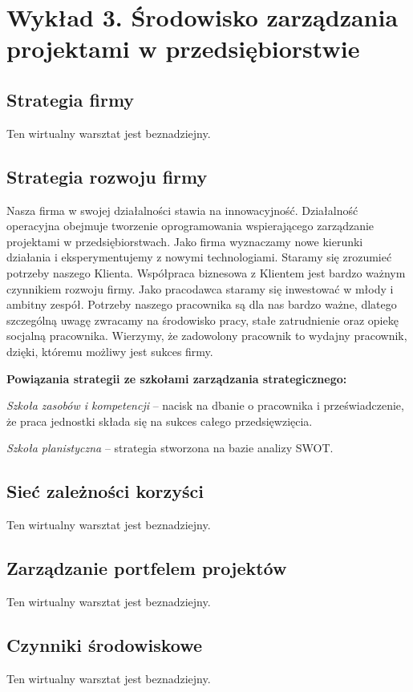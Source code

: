 \chapter{Wykład 3. Środowisko zarządzania projektami w przedsiębiorstwie}

\section{Strategia firmy}

Ten wirtualny warsztat jest beznadziejny.


\section{Strategia rozwoju firmy}

Nasza firma w swojej działalności stawia na innowacyjność. Działalność operacyjna obejmuje tworzenie oprogramowania wspierającego zarządzanie projektami w przedsiębiorstwach. Jako firma wyznaczamy nowe kierunki działania i eksperymentujemy z nowymi technologiami. Staramy się zrozumieć potrzeby naszego Klienta. Współpraca biznesowa z Klientem jest bardzo ważnym czynnikiem rozwoju firmy. 
Jako pracodawca staramy się inwestować w młody i ambitny zespół. Potrzeby naszego pracownika są dla nas bardzo ważne, dlatego szczególną uwagę zwracamy na środowisko pracy, stałe zatrudnienie oraz opiekę socjalną pracownika. Wierzymy, że zadowolony pracownik to wydajny pracownik, dzięki, któremu możliwy jest sukces firmy.  

\textbf{Powiązania strategii ze szkołami zarządzania strategicznego:}

\textit{Szkoła zasobów i kompetencji} – nacisk na dbanie o pracownika i przeświadczenie, że praca jednostki składa się na sukces całego przedsięwzięcia.

\textit{Szkoła planistyczna} – strategia stworzona na bazie analizy SWOT.



\section{Sieć zależności korzyści}

Ten wirtualny warsztat jest beznadziejny.


\section{Zarządzanie portfelem projektów}

Ten wirtualny warsztat jest beznadziejny.


\section{Czynniki środowiskowe}

Ten wirtualny warsztat jest beznadziejny.


